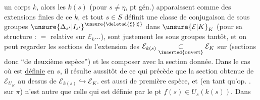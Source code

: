 un corps $k$, alors les $k(s)$ (pour $s\ne\eta$, pt gén.) apparaissent comme des extensions finies de ce $k$, et tout $s\in S$ définit une classe de conjugaison de sous groupes $\unsure{\Delta_{s'}|I_{s'}}^{\unsure{\deleted{\xi}|\xi}}$ dans $\unsure{\mathcal E|K}_K$ (pour sa structure :  $=$  relative sur $\mathcal E_k\ldots$),   sont justement les sous groupes      tantôt, et on peut regarder les sections de l'extension  des $\mathcal E_{k(s)}\underset{\inserted{\text{ouvert}}}{\subset}\mathcal E_K$ sur (sections donc ``de deuxième espèce'') et les composer avec la section donnée. Dans le cas où   est \uline{définie} en $s$, il résulte aussitôt de ce qui précède que la section  obtenue de $\mathcal E_{U_K}$ au dessus de $\mathcal E_{k(s)}\hookrightarrow\mathcal E_K$. est aussi de première espèce, et  (en tant qu'op. .  sur $\pi$)  n'est autre que celle qui est définie par le pt $f(s)\in U_s(k(s))$. Dans
